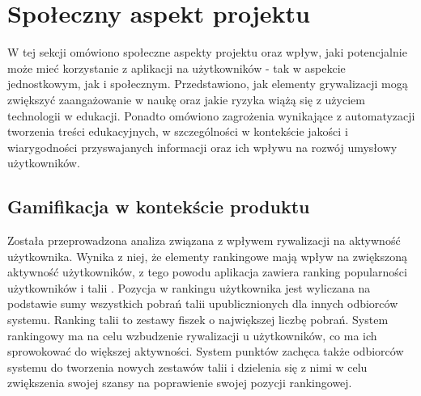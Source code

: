 \section{Społeczny aspekt projektu}

W tej sekcji omówiono społeczne aspekty projektu oraz wpływ, jaki potencjalnie może mieć korzystanie z aplikacji na użytkowników - tak w aspekcie jednostkowym, jak i społecznym. Przedstawiono, jak elementy grywalizacji mogą zwiększyć zaangażowanie w naukę oraz jakie ryzyka wiążą się z użyciem technologii w edukacji. Ponadto omówiono zagrożenia wynikające z automatyzacji tworzenia treści edukacyjnych, w szczególności w kontekście jakości i wiarygodności przyswajanych informacji oraz ich wpływu na rozwój umysłowy użytkowników.

\subsection{Gamifikacja w kontekście produktu}
Została przeprowadzona analiza związana z wpływem rywalizacji na aktywność użytkownika. Wynika z niej, że elementy rankingowe mają wpływ na zwiększoną aktywność użytkowników, z tego powodu aplikacja zawiera ranking popularności użytkowników i talii \cite{ablyGamification}. Pozycja w rankingu użytkownika jest wyliczana na podstawie sumy wszystkich pobrań talii upublicznionych dla innych odbiorców systemu. Ranking talii to zestawy fiszek o największej liczbę pobrań. System rankingowy ma na celu wzbudzenie rywalizacji u użytkowników, co ma ich sprowokować do większej aktywności. System punktów zachęca także odbiorców systemu do tworzenia nowych zestawów talii i dzielenia się z nimi w celu zwiększenia swojej szansy na poprawienie swojej pozycji rankingowej.


